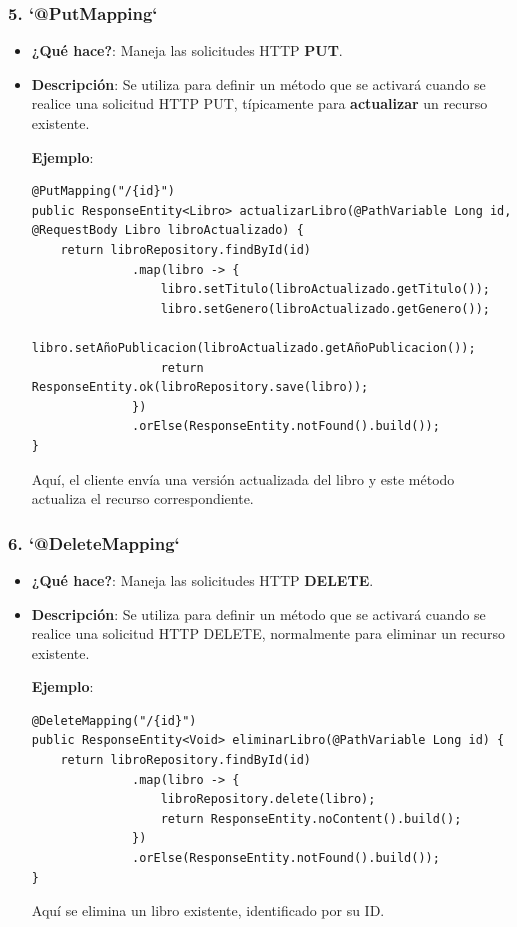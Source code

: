 \documentclass[11pt]{article}
\begin{document}
\subsubsection{5. \textbf{\textbf{`@PutMapping`}}}
\label{sec:orga60bef2}
\begin{itemize}
\item \textbf{\textbf{¿Qué hace?}}: Maneja las solicitudes HTTP \textbf{\textbf{PUT}}.
\item \textbf{\textbf{Descripción}}: Se utiliza para definir un método que se activará cuando se realice una solicitud HTTP PUT, típicamente para \textbf{\textbf{actualizar}} un recurso existente.

\textbf{\textbf{Ejemplo}}:
\begin{verbatim}
@PutMapping("/{id}")
public ResponseEntity<Libro> actualizarLibro(@PathVariable Long id, @RequestBody Libro libroActualizado) {
    return libroRepository.findById(id)
              .map(libro -> {
                  libro.setTitulo(libroActualizado.getTitulo());
                  libro.setGenero(libroActualizado.getGenero());
                  libro.setAñoPublicacion(libroActualizado.getAñoPublicacion());
                  return ResponseEntity.ok(libroRepository.save(libro));
              })
              .orElse(ResponseEntity.notFound().build());
}
\end{verbatim}

Aquí, el cliente envía una versión actualizada del libro y este método actualiza el recurso correspondiente.
\end{itemize}

\subsubsection{6. \textbf{\textbf{`@DeleteMapping`}}}
\label{sec:org2682cb7}
\begin{itemize}
\item \textbf{\textbf{¿Qué hace?}}: Maneja las solicitudes HTTP \textbf{\textbf{DELETE}}.
\item \textbf{\textbf{Descripción}}: Se utiliza para definir un método que se activará cuando se realice una solicitud HTTP DELETE, normalmente para eliminar un recurso existente.

\textbf{\textbf{Ejemplo}}:
\begin{verbatim}
@DeleteMapping("/{id}")
public ResponseEntity<Void> eliminarLibro(@PathVariable Long id) {
    return libroRepository.findById(id)
              .map(libro -> {
                  libroRepository.delete(libro);
                  return ResponseEntity.noContent().build();
              })
              .orElse(ResponseEntity.notFound().build());
}
\end{verbatim}

Aquí se elimina un libro existente, identificado por su ID.
\end{itemize}
\end{document}
